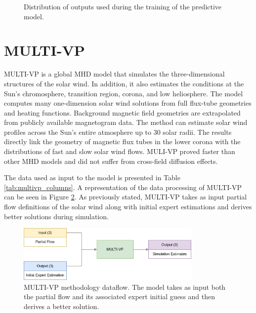 \begin{figure}[!ht]
\begin{subfigure}[b]{0.32\textwidth}
     \end{subfigure}
     \hfill
        \caption{Distribution of outputs used during the training of the predictive model.}
        \label{fig:output_distrib_bp}
\end{figure}


\section{MULTI-VP}\label{sec:multivp}

MULTI-VP \cite{pinto.rouillard_MultipleFluxtubeSolar_2017} is a global MHD model that simulates the three-dimensional structures of the solar wind. In addition, it also estimates the conditions at the Sun's chromosphere, transition region, corona, and low heliosphere. The model computes many one-dimension solar wind solutions from full flux-tube geometries and heating functions. Background magnetic field geometries are extrapolated from publicly available magnetogram data. The method can estimate solar wind profiles across the Sun's entire atmosphere up to 30 solar radii. The results directly link the geometry of magnetic flux tubes in the lower corona with the distributions of fast and slow solar wind flows. MULI-VP proved faster than other MHD models and did not suffer from cross-field diffusion effects.

The data used as input to the model is presented in Table \ref{tab:multivp_columns}. A representation of the data processing of MULTI-VP can be seen in Figure \ref{fig:multivp_method}. As previously stated, MULTI-VP takes as input partial flow definitions of the solar wind along with initial expert estimations and derives better solutions during simulation.

\vspace{0.5cm}
\begin{figure}[!h]
\centering
\includegraphics[width=0.8\textwidth]{figures/multivp_method.png}
\caption[MULTI-VP methodology dataflow]{MULTI-VP methodology dataflow. The model takes as input both the partial flow and its associated expert initial guess and then derives a better solution.\label{fig:multivp_method}}
\end{figure}


